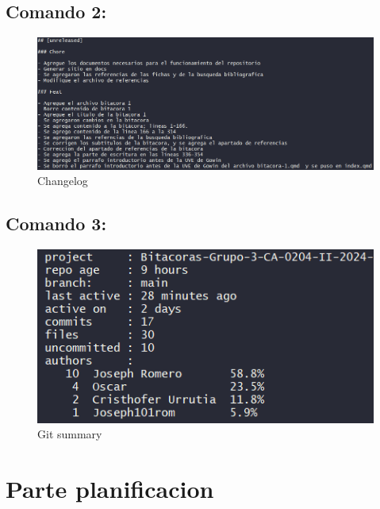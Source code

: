 \documentclass[
  letterpaper,
  DIV=11,
  numbers=noendperiod]{scrreprt}
\begin{document}
\hypertarget{comando-2}{%
\section{Comando 2:}\label{comando-2}}

\begin{figure}

{\centering \includegraphics{./imagenes/CHANGELOG-1.png}

}

\caption{Changelog}

\end{figure}

\hypertarget{comando-3}{%
\section{Comando 3:}\label{comando-3}}

\begin{figure}

{\centering \includegraphics{./imagenes/gitsummary-1.png}

}

\caption{Git summary}

\end{figure}


\hypertarget{parte-planificacion}{%
\chapter{Parte planificacion}\label{parte-planificacion}}
\end{document}
